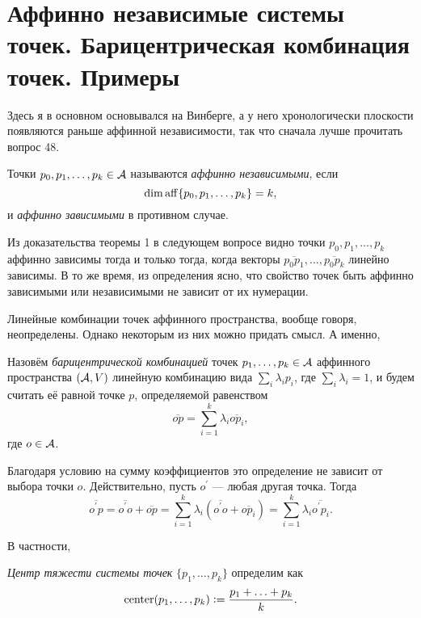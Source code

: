 \section{Аффинно независимые системы точек. Барицентрическая комбинация точек. Примеры}

Здесь я в основном основывался на Винберге, а у него хронологически плоскости появляются раньше аффинной независимости, так что сначала лучше прочитать вопрос 48.

\begin{definition}
    Точки $p_0, p_1, \ldots, p_k \in \mathcal{A}$ называются \textit{аффинно независимыми}, если \[\dim\operatorname{aff}\{p_0, p_1, \ldots, p_k\} = k,\] и \textit{аффинно зависимыми} в противном случае.
\end{definition}

Из доказательства теоремы 1 в следующем вопросе видно точки $p_0, p_1, \ldots, p_k$ аффинно зависимы тогда и только тогда, когда векторы $\overline{p_0p_1}, \ldots, \overline{p_0p_k}$ линейно зависимы. В то же время, из определения ясно, что свойство точек быть аффинно зависимыми или независимыми не зависит от их нумерации.

Линейные комбинации точек аффинного пространства, вообще говоря, неопределены. Однако некоторым из них можно придать смысл. А именно,

\begin{definition}
    Назовём \textit{барицентрической комбинацией} точек $p_1, \ldots, p_k \in \mathcal{A}$ аффинного пространства $(\mathcal{A}, V)$ линейную комбинацию вида $\sum\limits_i\lambda_ip_i$, где $\sum\limits_i\lambda_i = 1$, и будем считать её равной точке $p$, определяемой равенством
    \[
        \overline{op} = \sum_{i = 1}^k\lambda_i\overline{op_i},
    \]
    где $o \in \mathcal{A}$.
\end{definition}

Благодаря условию на сумму коэффициентов это определение не зависит от выбора точки $o$. Действительно, пусть $o^\prime$ --- любая другая точка. Тогда
\[
    \overline{o^\prime p} = \overline{o^\prime o} + \overline{op} = \sum_{i = 1}^k\lambda_i(\overline{o^\prime o} + \overline{op_i}) = \sum_{i = 1}^k\lambda_i\overline{o^\prime p_i}.
\]

В частности,

\begin{definition}
    \textit{Центр тяжести системы точек} $\{p_1, \ldots, p_k\}$ определим как
    \[
        \operatorname{center}(p_1, \ldots, p_k) \vcentcolon = \frac{p_1 + \ldots + p_k}{k}.
    \]
\end{definition}

